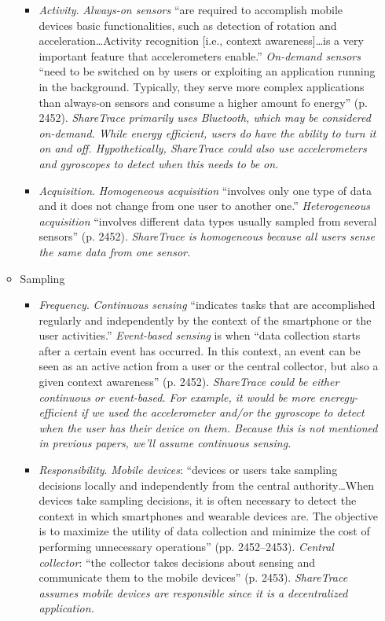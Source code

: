 \begin{itemize}
\begin{itemize}
\begin{itemize}
			\item \emph{Activity}. \emph{Always-on sensors} ``are required to accomplish mobile devices basic functionalities, such as detection of rotation and acceleration{\ldots}Activity recognition [i.e., context awareness]{\ldots}is a very important feature that accelerometers enable.'' \emph{On-demand sensors} ``need to be switched on by users or exploiting an application running in the background. Typically, they serve more complex applications than always-on sensors and consume a higher amount fo energy'' (p. 2452). \emph{ShareTrace primarily uses Bluetooth, which may be considered on-demand. While energy efficient, users do have the ability to turn it on and off. Hypothetically, ShareTrace could also use accelerometers and gyroscopes to detect when this needs to be on.}
			\item \emph{Acquisition}. \emph{Homogeneous acquisition} ``involves only one type of data and it does not change from one user to another one.'' \emph{Heterogeneous acquisition} ``involves different data types usually sampled from several sensors'' (p. 2452). \emph{ShareTrace is homogeneous because all users sense the same data from one sensor.}
			\end{itemize}
		\item Sampling
			\begin{itemize}
			\item \emph{Frequency}. \emph{Continuous sensing} ``indicates tasks that are accomplished regularly and independently by the context of the smartphone or the user activities.'' \emph{Event-based sensing} is when ``data collection starts after a certain event has occurred. In this context, an event can be seen as an active action from a user or the central collector, but also a given context awareness'' (p. 2452). \emph{ShareTrace could be either continuous or event-based. For example, it would be more eneregy-efficient if we used the accelerometer and/or the gyroscope to detect when the user has their device on them. Because this is not mentioned in previous papers, we'll assume continuous sensing.}
			\item \emph{Responsibility}. \emph{Mobile devices}: ``devices or users take sampling decisions locally and independently from the central authority{\ldots}When devices take sampling decisions, it is often necessary to detect the context in which smartphones and wearable devices are. The objective is to maximize the utility of data collection and minimize the cost of performing unnecessary operations'' (pp. 2452--2453). \emph{Central collector}: ``the collector takes decisions about sensing and communicate them to the mobile devices'' (p. 2453). \emph{ShareTrace assumes mobile devices are responsible since it is a decentralized application.}

\end{itemize}
\end{itemize}
\end{itemize}
